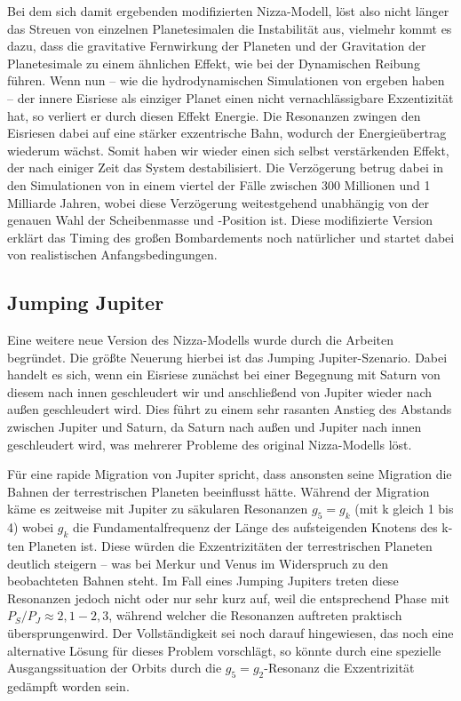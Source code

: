 \documentclass[12pt,a4paper,twoside]{article}
\renewcommand{\cite}{\citep}
\begin{document}
Bei dem sich damit ergebenden modifizierten Nizza-Modell, löst also nicht länger das Streuen von einzelnen Planetesimalen die Instabilität aus, vielmehr kommt es dazu, dass die gravitative Fernwirkung der Planeten und der Gravitation der Planetesimale zu einem ähnlichen Effekt, wie bei der Dynamischen Reibung führen.
Wenn nun -- wie die hydrodynamischen Simulationen von \cite{Morbidelli2007b} ergeben haben -- der innere Eisriese als einziger Planet einen nicht vernachlässigbare Exzentizität hat, so verliert er durch diesen Effekt Energie. Die Resonanzen zwingen den Eisriesen dabei auf eine stärker exzentrische Bahn, wodurch der Energieübertrag wiederum wächst.
Somit haben wir wieder einen sich selbst verstärkenden Effekt, der nach einiger Zeit das System destabilisiert. Die Verzögerung betrug dabei in den Simulationen von \cite{Levison2011} in einem viertel der Fälle zwischen 300 Millionen und 1 Milliarde Jahren, wobei diese Verzögerung weitestgehend unabhängig von der genauen Wahl der Scheibenmasse und -Position ist.
Diese modifizierte Version erklärt das Timing des großen Bombardements noch natürlicher und startet dabei von realistischen Anfangsbedingungen.

\subsection{Jumping Jupiter}\label{jumpingjupiter}
Eine weitere neue Version des Nizza-Modells wurde durch die Arbeiten \cite{Morbidelli2009,Brasser2009,Morbidelli2010} begründet. Die größte Neuerung hierbei ist das \glqq Jumping Jupiter-Szenario\grqq.
Dabei handelt es sich, wenn ein Eisriese zunächst bei einer Begegnung mit Saturn von diesem nach innen geschleudert wir und anschließend von Jupiter wieder nach außen geschleudert wird.
Dies führt zu einem sehr rasanten Anstieg des Abstands zwischen Jupiter und Saturn, da Saturn nach außen und Jupiter nach innen geschleudert wird, was mehrerer Probleme des original Nizza-Modells löst.

Für eine rapide Migration von Jupiter spricht, dass ansonsten seine Migration die Bahnen der terrestrischen Planeten beeinflusst hätte\cite{Brasser2009}. Während der Migration käme es zeitweise mit Jupiter zu säkularen Resonanzen $g_5 = g_k$ (mit k gleich 1 bis 4) wobei $g_k$ die Fundamentalfrequenz der Länge des aufsteigenden Knotens des k-ten Planeten ist. Diese würden die Exzentrizitäten der terrestrischen Planeten deutlich steigern – was bei Merkur und Venus im Widerspruch zu den beobachteten Bahnen steht. Im Fall eines Jumping Jupiters treten diese Resonanzen jedoch nicht oder nur sehr kurz auf, weil die entsprechend Phase mit $P_S/P_J\approx2,1-2,3$, während welcher die Resonanzen auftreten praktisch \glqq übersprungen\grqq wird. %
Der Vollständigkeit sei noch darauf hingewiesen, das \cite{Brasser2009} noch eine alternative Lösung für dieses Problem vorschlägt, so könnte durch eine spezielle Ausgangssituation der Orbits durch die $g_5=g_2$-Resonanz die Exzentrizität gedämpft worden sein. %
\end{document}

